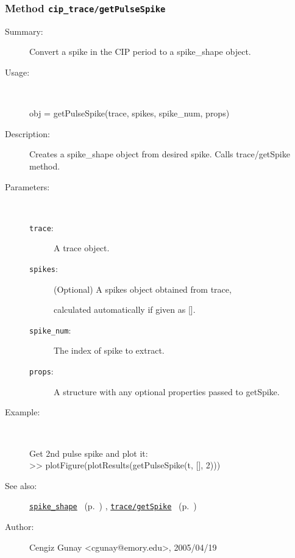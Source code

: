 \subsubsection[Method \texttt{getPulseSpike}]{Method \texttt{cip\_trace/getPulseSpike}}%
%
\label{ref_cip_trace__getPulseSpike}%
\hypertarget{ref_cip_trace__getPulseSpike}{}%
\begin{description}
\item[Summary:]Convert a spike in the CIP period to a spike\_shape object.
%
\item[Usage:]~%
\begin{lyxcode}%
obj = getPulseSpike(trace, spikes, spike\_num, props)
%
\end{lyxcode}%
%
\item[Description:]%
Creates a spike\_shape object from desired spike. Calls trace/getSpike method.
\item[Parameters:]~
\begin{description}%
\item[\texttt{trace}:]
 A trace object.
\item[\texttt{spikes}:]
 (Optional) A spikes object obtained from trace, 

calculated automatically if given as [].\item[\texttt{spike\_num}:]
 The index of spike to extract.
\item[\texttt{props}:]
 A structure with any optional properties passed to getSpike.
\end{description}%
%
%
\item[Example:]~
\begin{lyxcode} Get 2nd pulse spike and plot it:\\%
 >> plotFigure(plotResults(getPulseSpike(t, [], 2)))\\%
\end{lyxcode}
%
\item[See also:]%
\hyperlink{ref_spike_shape}{\texttt{spike\_shape}}%
\ (p.~\pageref{ref_spike_shape})%
%
, \hyperlink{ref_trace__getSpike}{\texttt{trace/getSpike}}%
\ (p.~\pageref{ref_trace__getSpike})%
%
%
\item[Author:]%
Cengiz Gunay <cgunay@emory.edu>, 2005/04/19%
\end{description}
\methodline%
